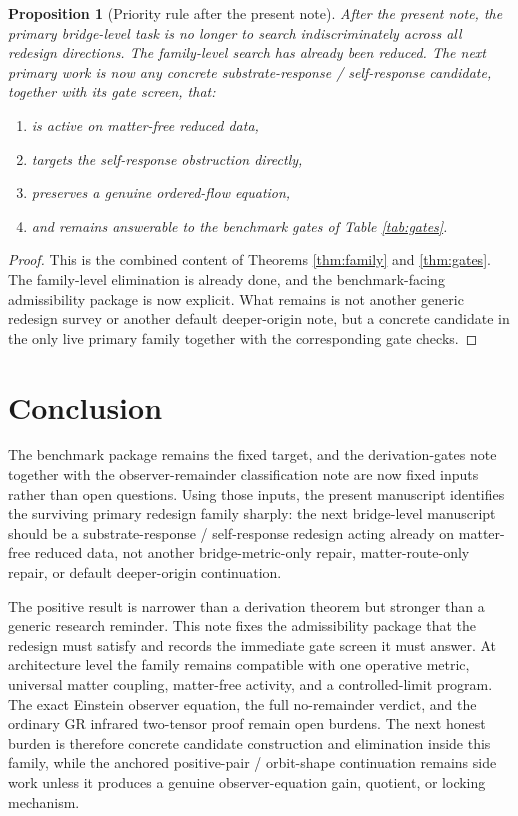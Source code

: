 \documentclass[11pt]{article}
\newtheorem{proposition}{Proposition}
\begin{document}
\begin{proposition}[Priority rule after the present note]
\label{prop:priority}
After the present note, the primary bridge-level task is no longer to search indiscriminately across all redesign directions. The family-level search has already been reduced. The next primary work is now any concrete substrate-response / self-response candidate, together with its gate screen, that:
\begin{enumerate}
    \item is active on matter-free reduced data,
    \item targets the self-response obstruction directly,
    \item preserves a genuine ordered-flow equation,
    \item and remains answerable to the benchmark gates of Table \ref{tab:gates}.
\end{enumerate}
\end{proposition}

\begin{proof}
This is the combined content of Theorems \ref{thm:family} and \ref{thm:gates}. The family-level elimination is already done, and the benchmark-facing admissibility package is now explicit. What remains is not another generic redesign survey or another default deeper-origin note, but a concrete candidate in the only live primary family together with the corresponding gate checks.
\end{proof}

\section{Conclusion}

The benchmark package remains the fixed target, and the derivation-gates note together with the observer-remainder classification note are now fixed inputs rather than open questions. Using those inputs, the present manuscript identifies the surviving primary redesign family sharply: the next bridge-level manuscript should be a substrate-response / self-response redesign acting already on matter-free reduced data, not another bridge-metric-only repair, matter-route-only repair, or default deeper-origin continuation.

The positive result is narrower than a derivation theorem but stronger than a generic research reminder. This note fixes the admissibility package that the redesign must satisfy and records the immediate gate screen it must answer. At architecture level the family remains compatible with one operative metric, universal matter coupling, matter-free activity, and a controlled-limit program. The exact Einstein observer equation, the full no-remainder verdict, and the ordinary GR infrared two-tensor proof remain open burdens. The next honest burden is therefore concrete candidate construction and elimination inside this family, while the anchored positive-pair / orbit-shape continuation remains side work unless it produces a genuine observer-equation gain, quotient, or locking mechanism.
\end{document}
